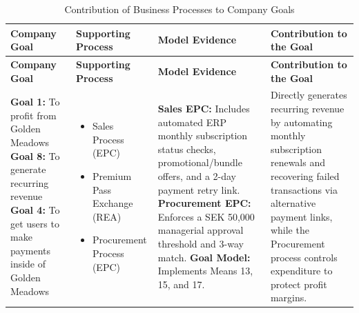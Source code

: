\documentclass{article}
\begin{document}
{\footnotesize
\setlength{\tabcolsep}{4pt}
\renewcommand{\arraystretch}{1.3}
\begin{longtable}{L{0.20\textwidth} L{0.22\textwidth} L{0.26\textwidth} L{0.26\textwidth}}
    \caption{Contribution of Business Processes to Company Goals}
    \label{tab:goal-process-traceability} \\
    \toprule
    \textbf{Company Goal} & \textbf{Supporting Process} & \textbf{Model Evidence} & \textbf{Contribution to the Goal} \\
    \midrule
    \endfirsthead

    \toprule
    \textbf{Company Goal} & \textbf{Supporting Process} & \textbf{Model Evidence} & \textbf{Contribution to the Goal} \\
    \midrule
    \endhead

    \bottomrule
    \endlastfoot

    \textbf{Goal 1:} To profit from Golden Meadows \newline
    \textbf{Goal 8:} To generate recurring revenue \newline
    \textbf{Goal 4:} To get users to make payments inside of Golden Meadows
    & \begin{itemize}
        \item Sales Process (EPC)
        \item Premium Pass Exchange (REA)
        \item Procurement Process (EPC)
    \end{itemize}
    & \textbf{Sales EPC:} Includes automated ERP monthly subscription status checks, promotional/bundle offers, and a 2-day payment retry link.\newline
      \textbf{Procurement EPC:} Enforces a SEK 50,000 managerial approval threshold and 3-way match.\newline
      \textbf{Goal Model:} Implements Means 13, 15, and 17.
    & Directly generates recurring revenue by automating monthly subscription renewals and recovering failed transactions via alternative payment links, while the Procurement process controls expenditure to protect profit margins. \\
    \midrule


\end{longtable}}
\end{document}
